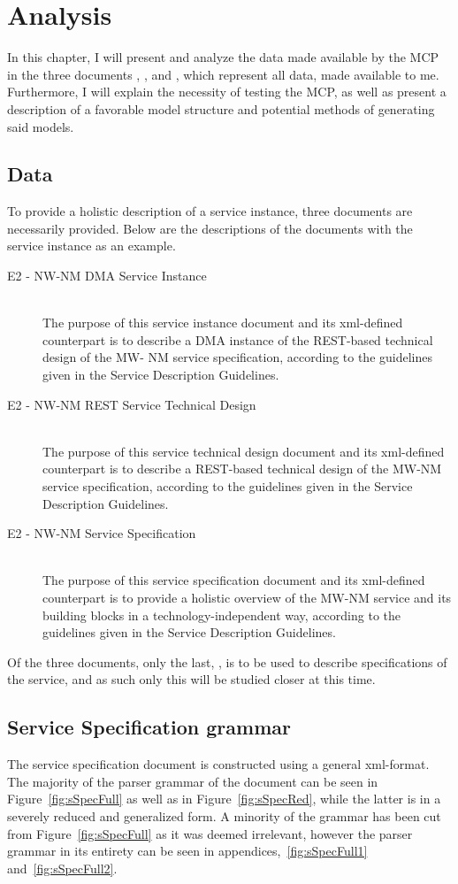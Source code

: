 \chapter{Analysis}

In this chapter, I will present and analyze the data made available by the MCP in the three documents , , and , which represent all data, made available to me. Furthermore, I will explain the necessity of testing the MCP, as well as present a description of a favorable model structure and potential methods of generating said models.

\section{Data}

To provide a holistic description of a service instance, three documents are necessarily provided. Below are the descriptions of the documents with the service instance  as an example.
\begin{description}
  \item[E2 - NW-NM DMA Service Instance]\ \\
    The purpose of this service instance document and its xml-defined counterpart is to describe a DMA instance of the REST-based technical design of the MW- NM service specification, according to the guidelines given in the Service Description Guidelines.
  \item[E2 - NW-NM REST Service Technical Design]\ \\
    The purpose of this service technical design document and its xml-defined counterpart is to describe a REST-based technical design of the MW-NM service specification, according to the guidelines given in the Service Description Guidelines.
  \item[E2 - NW-NM Service Specification]\ \\
    The purpose of this service specification document and its xml-defined counterpart is to provide a holistic overview of the MW-NM service and its building blocks in a technology-independent way, according to the guidelines given in the Service Description Guidelines.
\end{description}
Of the three documents, only the last, , is to be used to describe specifications of the service, and as such only this will be studied closer at this time.
\section{Service Specification grammar}
The service specification document is constructed using a general xml-format. The majority of the parser grammar of the document can be seen in Figure~\ref{fig:sSpecFull} as well as in Figure~\ref{fig:sSpecRed}, while the latter is in a severely reduced and generalized form. A minority of the grammar has been cut from Figure~\ref{fig:sSpecFull} as it was deemed irrelevant, however the parser grammar in its entirety can be seen in appendices,~\ref{fig:sSpecFull1} and~\ref{fig:sSpecFull2}.

